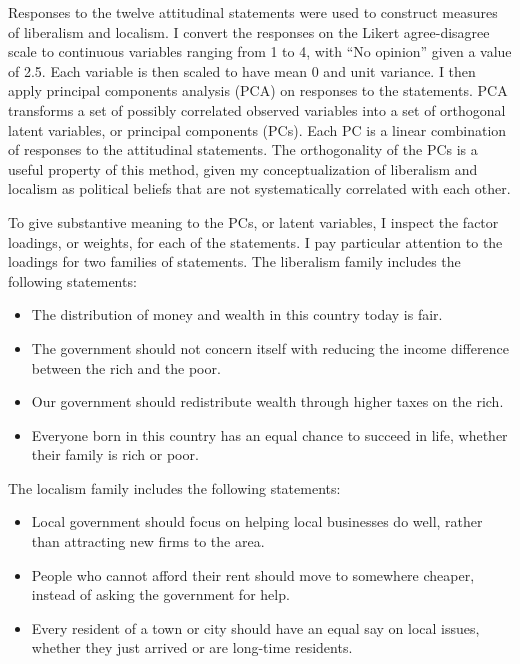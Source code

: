 \documentclass[article,11pt]{memoir}
\begin{document}
Responses to the twelve attitudinal statements were used to construct measures of liberalism and localism.  I convert the responses on the Likert agree-disagree scale to continuous variables ranging from 1 to 4, with ``No opinion'' given a value of 2.5.  Each variable is then scaled to have mean 0 and unit variance.  I then apply principal components analysis (PCA) on responses to the statements. PCA transforms a set of possibly correlated observed variables into a set of orthogonal latent variables, or principal components (PCs).  Each PC is a linear combination of responses to the attitudinal statements. The orthogonality of the PCs is a useful property of this method, given my conceptualization of liberalism and localism as political beliefs that are not systematically correlated with each other.

To give substantive meaning to the PCs, or latent variables, I inspect the factor loadings, or weights, for each of the statements.  I pay particular attention to the loadings for two families of statements.  The liberalism family includes the following statements:

\begin{itemize}
  \item The distribution of money and wealth in this country today is fair.
  \item The government should not concern itself with reducing the income difference between the rich and the poor.
  \item Our government should redistribute wealth through higher taxes on the rich.
  \item Everyone born in this country has an equal chance to succeed in life, whether their family is rich or poor.
\end{itemize}

The localism family includes the following statements:

\begin{itemize}
  \item Local government should focus on helping local businesses do well, rather than attracting new firms to the area.
  \item People who cannot afford their rent should move to somewhere cheaper, instead of asking the government for help.
  \item Every resident of a town or city should have an equal say on local issues, whether they just arrived or are long-time residents.
\end{itemize}
\end{document}
